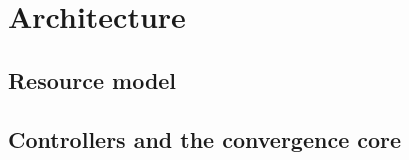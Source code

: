 \section{Architecture}
\label{sec:arch}


\subsection{Resource model}

\subsection{Controllers and the convergence core}

